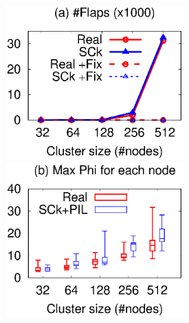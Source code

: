 


\def \fgw {2.7in}



\begin{figure}[t]





\centerline{
\includegraphics[width=\fgw]{F/accu/eps/flap}
\includegraphics[width=\fgw]{F/accu/eps/phi}
}


\end{figure}
